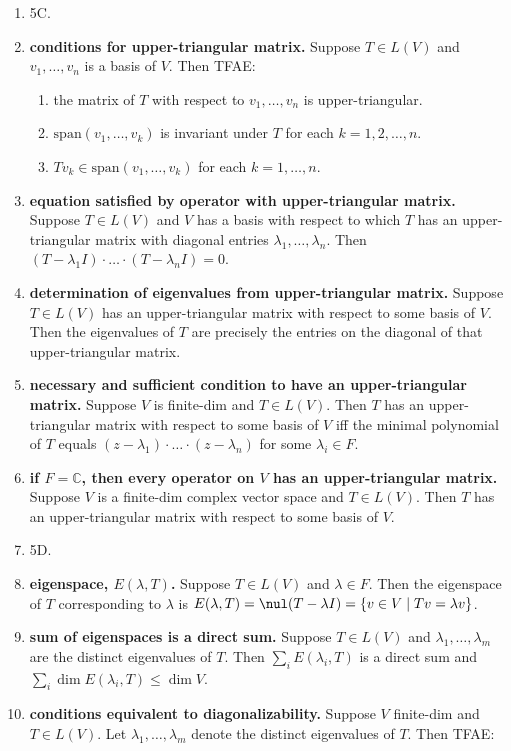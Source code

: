 \begin{enumerate}
	\item 5C. 
	\item \textbf{conditions for upper-triangular matrix. } Suppose $T \in L(V)$ and $v_1,\dots,v_n$ is a basis of $V$. Then TFAE: 
	\begin{enumerate}
		\item the matrix of $T$ with respect to $v_1,\dots,v_n$ is upper-triangular. 
		\item $\textrm{span}(v_1,\dots,v_k)$ is invariant under $T$ for each $k = 1,2,\dots,n$. 
		\item $Tv_k \in \textrm{span}(v_1,\dots,v_k)$ for each $k=1,\dots,n$. 
	\end{enumerate}
	\item \textbf{equation satisfied by operator with upper-triangular matrix. } Suppose $T \in L(V)$ and $V$ has a basis with respect to which $T$ has an upper-triangular matrix with diagonal entries $\lambda_1,\dots,\lambda_n$. Then $(T-\lambda_1 I) \cdot \dots \cdot (T-\lambda_n I) = 0$. 
	\item \textbf{determination of eigenvalues from upper-triangular matrix. } Suppose $T \in L(V)$ has an upper-triangular matrix with respect to some basis of $V$. Then the eigenvalues of $T$ are precisely the entries on the diagonal of that upper-triangular matrix. 
	\item \textbf{necessary and sufficient condition to have an upper-triangular matrix. } Suppose $V$ is finite-dim and $T \in L(V)$. Then $T$ has an upper-triangular matrix with respect to some basis of $V$ iff the minimal polynomial of $T$ equals $(z-\lambda_1) \cdot \dots \cdot (z-\lambda_n)$ for some $\lambda_i \in F$. 
	\item \textbf{if $F = \mathbb{C}$, then every operator on $V$ has an upper-triangular matrix. } Suppose $V$ is a finite-dim complex vector space and $T \in L(V)$. Then $T$ has an upper-triangular matrix with respect to some basis of $V$. 
	\item 5D. 
	\item \textbf{eigenspace, $E(\lambda, T)$. } Suppose $T \in L(V)$ and $\lambda \in F$. Then the eigenspace of $T$ corresponding to $\lambda$ is $E(\lambda,T) = \nul (T - \lambda I) = \{v \in V \mid Tv = \lambda v\}$. 
	\item \textbf{sum of eigenspaces is a direct sum. } Suppose $T \in L(V)$ and $\lambda_1,\dots,\lambda_m$ are the distinct eigenvalues of $T$. Then $\sum_i E(\lambda_i,T)$ is a direct sum and $\sum_i \dim E(\lambda_i, T) \leq \dim V$. 
	\item \textbf{conditions equivalent to diagonalizability. } Suppose $V$ finite-dim and $T \in L(V)$. Let $\lambda_1,\dots,\lambda_m$ denote the distinct eigenvalues of $T$. Then TFAE: 

\end{enumerate}
